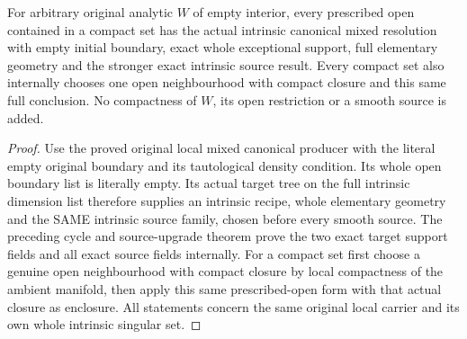 \begin{theorem}
\label{hir:original-nonpure-local-exact-empty-specializations}
For arbitrary original analytic $W$ of empty interior, every prescribed
open contained in a compact set has the actual intrinsic canonical
mixed resolution with empty initial boundary, exact whole exceptional
support, full elementary geometry and the stronger exact intrinsic
source result. Every compact set also internally chooses one open
neighbourhood with compact closure and this same full conclusion.
No compactness of $W$, its open restriction or a smooth source is added.
\leanok
\end{theorem}
\begin{proof}
Use the proved original local mixed canonical producer with the literal
empty original boundary and its tautological density condition. Its
whole open boundary list is literally empty. Its actual target tree
on the full intrinsic dimension list therefore supplies an intrinsic
recipe, whole elementary geometry and the SAME intrinsic source
family, chosen before every smooth source. The preceding cycle and
source-upgrade theorem prove the two exact target support fields and
all exact source fields internally. For a compact set first choose a
genuine open neighbourhood with compact closure by local compactness
of the ambient manifold, then apply this same prescribed-open form
with that actual closure as enclosure. All statements concern the
same original local carrier and its own whole intrinsic singular set.
\end{proof}
